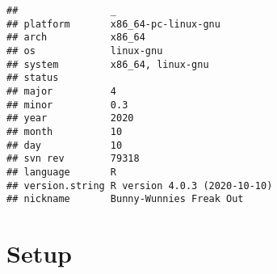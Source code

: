 \documentclass[]{book}
\begin{document}
\begin{verbatim}
##                _                           
## platform       x86_64-pc-linux-gnu         
## arch           x86_64                      
## os             linux-gnu                   
## system         x86_64, linux-gnu           
## status                                     
## major          4                           
## minor          0.3                         
## year           2020                        
## month          10                          
## day            10                          
## svn rev        79318                       
## language       R                           
## version.string R version 4.0.3 (2020-10-10)
## nickname       Bunny-Wunnies Freak Out
\end{verbatim}

\hypertarget{setup-2}{%
\section{Setup}\label{setup-2}}
\end{document}
